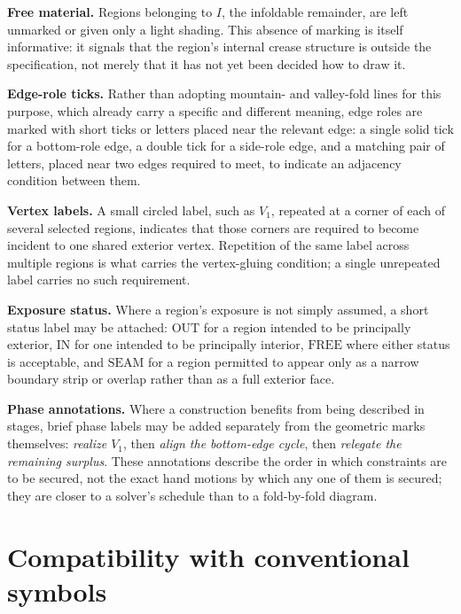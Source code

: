 \documentclass[11pt,oneside]{book}
\begin{document}
\textbf{Free material.} Regions belonging to \(I\), the infoldable
remainder, are left unmarked or given only a light shading. This absence
of marking is itself informative: it signals that the region's internal
crease structure is outside the specification, not merely that it has
not yet been decided how to draw it.

\textbf{Edge-role ticks.} Rather than adopting mountain- and valley-fold
lines for this purpose, which already carry a specific and different
meaning, edge roles are marked with short ticks or letters placed near
the relevant edge: a single solid tick for a bottom-role edge, a double
tick for a side-role edge, and a matching pair of letters, placed near
two edges required to meet, to indicate an adjacency condition between
them.

\textbf{Vertex labels.} A small circled label, such as \(V_1\), repeated
at a corner of each of several selected regions, indicates that those
corners are required to become incident to one shared exterior vertex.
Repetition of the same label across multiple regions is what carries the
vertex-gluing condition; a single unrepeated label carries no such
requirement.

\textbf{Exposure status.} Where a region's exposure is not simply
assumed, a short status label may be attached: \(\text{OUT}\) for a
region intended to be principally exterior, \(\text{IN}\) for one
intended to be principally interior, \(\text{FREE}\) where either status
is acceptable, and \(\text{SEAM}\) for a region permitted to appear only
as a narrow boundary strip or overlap rather than as a full exterior
face.

\textbf{Phase annotations.} Where a construction benefits from being
described in stages, brief phase labels may be added separately from the
geometric marks themselves: \emph{realize \(V_1\)}, then \emph{align the
bottom-edge cycle}, then \emph{relegate the remaining surplus}. These
annotations describe the order in which constraints are to be secured,
not the exact hand motions by which any one of them is secured; they are
closer to a solver's schedule than to a fold-by-fold diagram.

\hypertarget{compatibility-with-conventional-symbols}{%
\section{Compatibility with conventional
symbols}\label{compatibility-with-conventional-symbols}}
\end{document}
